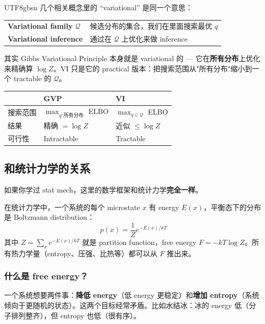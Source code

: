 \documentclass[11pt]{article}
\begin{document}
\begin{CJK}{UTF8}{gbsn}
几个相关概念里的 ``variational'' 是同一个意思：

\begin{center}
\begin{tabular}{l|l}
  \textbf{Variational family} $\mathcal{Q}$ & 候选分布的集合，我们在里面搜索最优 $q$ \\
  \textbf{Variational inference} & 通过在 $\mathcal{Q}$ 上优化来做 inference \\
\end{tabular}
\end{center}

其实 Gibbs Variational Principle 本身就是 variational 的 --- 它在\textbf{所有分布}上优化来精确算 $\log Z$。VI 只是它的 practical 版本：把搜索范围从"所有分布"缩小到一个 tractable 的 $\mathcal{Q}$。

\begin{center}
\begin{tabular}{l|l|l}
  & \textbf{GVP} & \textbf{VI} \\
  \hline
  搜索范围 & $\max_{q:\text{所有分布}}$ ELBO & $\max_{q \in \mathcal{Q}}$ ELBO \\
  结果 & 精确 $= \log Z$ & 近似 $\leq \log Z$ \\
  可行性 & Intractable & Tractable \\
\end{tabular}
\end{center}

\subsection{和统计力学的关系}

如果你学过 stat mech，这里的数学框架和统计力学\textbf{完全一样}。

在统计力学中，一个系统的每个 microstate $x$ 有 energy $E(x)$，平衡态下的分布是 Boltzmann distribution：
\[
  p(x) = \frac{1}{Z} e^{-E(x)/kT}
\]
其中 $Z = \sum_x e^{-E(x)/kT}$ 就是 partition function，free energy $F = -kT\log Z$。所有热力学量（entropy、压强、比热等）都可以从 $F$ 推出来。

\subsubsection{什么是 free energy？}

一个系统想要两件事：\textbf{降低 energy}（低 energy 更稳定）和\textbf{增加 entropy}（系统倾向于更随机的状态）。这两个目标经常矛盾。比如水结冰：冰的 energy 低（分子排列整齐），但 entropy 也低（很有序）。


\end{CJK}
\end{document}
